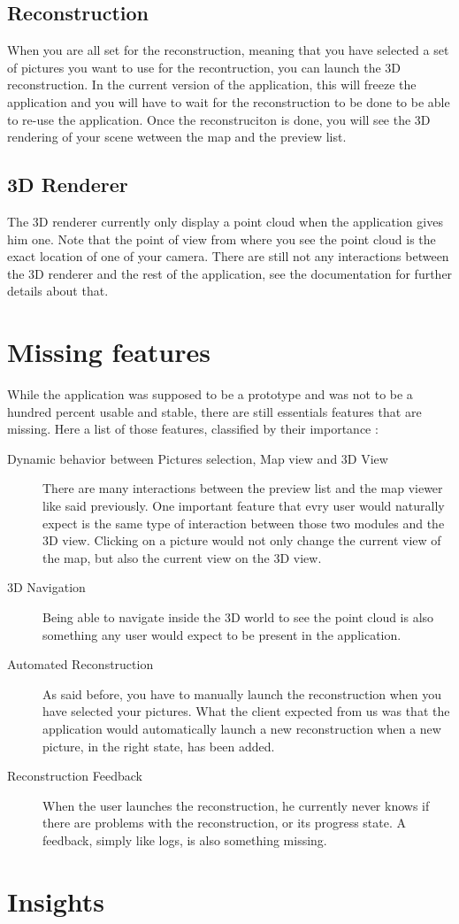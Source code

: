 \subsection*{Reconstruction}
When you are all set for the reconstruction, meaning that you have selected a set of pictures you want to use for the recontruction, you can launch the 3D reconstruction. In the current version of the application,
this will freeze the application and you will have to wait for the reconstruction to be done to be able to re-use the application. Once the reconstruciton is done, you will see the 3D rendering of your scene wetween the map
and the preview list.

\subsection*{3D Renderer}
The 3D renderer currently only display a point cloud when the application gives him one. Note that the point of view from where you see the point cloud is the exact location of one of your camera. There 
are still not any interactions between the 3D renderer and the rest of the application, see the documentation for further details about that.

\section{Missing features}
While the application was supposed to be a prototype and was not to be a hundred percent usable and stable, there are still essentials features that are missing. Here a list of those features, classified by their importance :
\begin{description}
\item[Dynamic behavior between Pictures selection, Map view and 3D View] There are many interactions between the preview list and the map viewer like said previously. One important feature that evry user would naturally
expect is the same type of interaction between those two modules and the 3D view. Clicking on a picture would not only change the current view of the map, but also the current view on the 3D view.
\item[3D Navigation] Being able to navigate inside the 3D world to see the point cloud is also something any user would expect to be present in the application. 
\item[Automated Reconstruction] As said before, you have to manually launch the reconstruction when you have selected your pictures. What the client expected from us was that the application would automatically launch
a new reconstruction when a new picture, in the right state, has been added. 
\item[Reconstruction Feedback] When the user launches the reconstruction, he currently never knows if there are problems with the reconstruction, or its progress state. A feedback, simply like logs, is also something missing.
\end{description}

\section{Insights}
